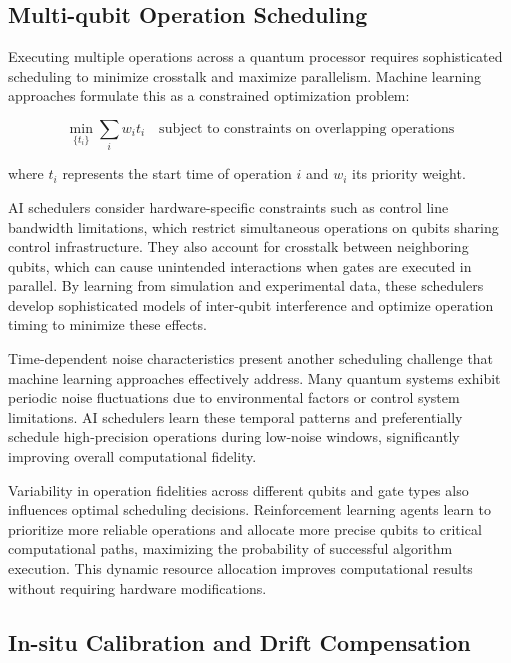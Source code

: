 \subsection{Multi-qubit Operation Scheduling}

Executing multiple operations across a quantum processor requires sophisticated scheduling to minimize crosstalk and maximize parallelism. Machine learning approaches formulate this as a constrained optimization problem:

\begin{equation}
\min_{\{t_i\}} \sum_i w_i t_i \quad \text{subject to constraints on overlapping operations}
\end{equation}

where $t_i$ represents the start time of operation $i$ and $w_i$ its priority weight.

AI schedulers consider hardware-specific constraints such as control line bandwidth limitations, which restrict simultaneous operations on qubits sharing control infrastructure. They also account for crosstalk between neighboring qubits, which can cause unintended interactions when gates are executed in parallel. By learning from simulation and experimental data, these schedulers develop sophisticated models of inter-qubit interference and optimize operation timing to minimize these effects.

Time-dependent noise characteristics present another scheduling challenge that machine learning approaches effectively address. Many quantum systems exhibit periodic noise fluctuations due to environmental factors or control system limitations. AI schedulers learn these temporal patterns and preferentially schedule high-precision operations during low-noise windows, significantly improving overall computational fidelity.

Variability in operation fidelities across different qubits and gate types also influences optimal scheduling decisions. Reinforcement learning agents learn to prioritize more reliable operations and allocate more precise qubits to critical computational paths, maximizing the probability of successful algorithm execution. This dynamic resource allocation improves computational results without requiring hardware modifications.

\subsection{In-situ Calibration and Drift Compensation}

